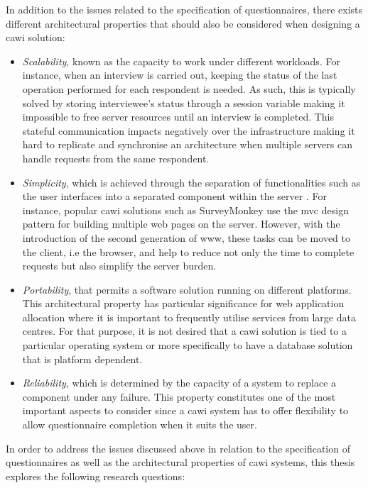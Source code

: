 	In addition to the issues related to the specification of questionnaires, there exists different architectural properties that should also be considered when designing a \gls{cawi} solution:
	\begin{itemize}
		\item \emph{Scalability}, known as the capacity to work under different workloads. For instance, when an interview is carried out, keeping the status of the last operation performed for each respondent is needed. As such, this is typically solved by storing interviewee's status through a session variable making it impossible to free server resources until an interview is completed. This stateful communication impacts negatively over the infrastructure making it hard to replicate and synchronise an architecture when multiple servers can handle requests from the same respondent.
		\item \emph{Simplicity}, which is achieved through the separation of functionalities such as the user interfaces into a separated component within the server \cite{phdthesis:fielding00}. For instance, popular \gls{cawi} solutions such as SurveyMonkey use the \gls{mvc} design pattern for building multiple web pages on the server. However, with the introduction of the second generation of \gls{www}, these tasks can be moved to the client, i.e the browser, and help to reduce not only the time to complete requests but also simplify the server burden.
		\item \emph{Portability}, that permits a software solution running on different platforms. This architectural property has particular significance for web application allocation where it is important to frequently utilise services from large data centres. For that purpose, it is not desired that a \gls{cawi} solution is tied to a particular operating system or more specifically to have a database solution that is platform dependent.
		\item \emph{Reliability}, which is determined by the capacity of a system to replace a component under any failure. This property constitutes one of the most important aspects to consider since a \gls{cawi} system has to offer flexibility to allow questionnaire completion when it suits the user. 
	\end{itemize}
	
	In order to address the issues discussed above in relation to the specification of questionnaires as well as the architectural properties of \gls{cawi} systems, this thesis explores the following research questions:

